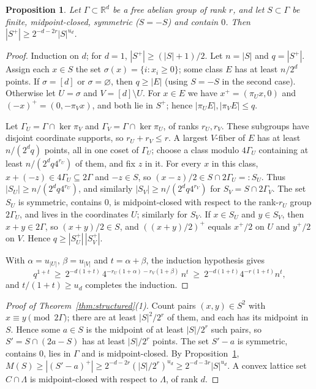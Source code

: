 \documentclass[11pt]{amsart}
\newtheorem{proposition}[theorem]{Proposition}
\theoremstyle{definition}
\theoremstyle{remark}
\newcommand{\R}{\mathbb{R}}
\newcommand{\Mf}{M}
\begin{document}
\begin{proposition}\label{prop:centered}
Let $\Gamma\subset\R^d$ be a free abelian group of rank $r$, and let $S\subset\Gamma$ be finite, midpoint-closed, symmetric ($S=-S$) and contain $0$. Then $|S^+|\ge2^{-d-2r}|S|^{u_d}$.
\end{proposition}

\begin{proof}
Induction on $d$; for $d=1$, $|S^+|\ge(|S|+1)/2$. Let $n=|S|$ and $q=|S^+|$. Assign each $x\in S$ the set $\sigma(x)=\{i:x_i\ge0\}$; some class $E$ has at least $n/2^d$ points. If $\sigma=[d]$ or $\sigma=\varnothing$, then $q\ge|E|$ (using $S=-S$ in the second case). Otherwise let $U=\sigma$ and $V=[d]\setminus U$. For $x\in E$ we have $x^+=(\pi_Ux,0)$ and $(-x)^+=(0,-\pi_Vx)$, and both lie in $S^+$; hence $|\pi_UE|,|\pi_VE|\le q$.

Let $\Gamma_U=\Gamma\cap\ker\pi_V$ and $\Gamma_V=\Gamma\cap\ker\pi_U$, of ranks $r_U,r_V$. These subgroups have disjoint coordinate supports, so $r_U+r_V\le r$. A largest $V$-fiber of $E$ has at least $n/(2^dq)$ points, all in one coset of $\Gamma_U$; choose a class modulo $4\Gamma_U$ containing at least $n/(2^dq4^{r_U})$ of them, and fix $z$ in it. For every $x$ in this class, $x+(-z)\in4\Gamma_U\subseteq2\Gamma$ and $-z\in S$, so $(x-z)/2\in S\cap2\Gamma_U=:S_U$. Thus $|S_U|\ge n/(2^dq4^{r_U})$, and similarly $|S_V|\ge n/(2^dq4^{r_V})$ for $S_V=S\cap2\Gamma_V$. The set $S_U$ is symmetric, contains $0$, is midpoint-closed with respect to the rank-$r_U$ group $2\Gamma_U$, and lives in the coordinates $U$; similarly for $S_V$. If $x\in S_U$ and $y\in S_V$, then $x+y\in2\Gamma$, so $(x+y)/2\in S$, and $((x+y)/2)^+$ equals $x^+/2$ on $U$ and $y^+/2$ on $V$. Hence $q\ge|S_U^+|\,|S_V^+|$.

With $\alpha=u_{|U|}$, $\beta=u_{|V|}$ and $t=\alpha+\beta$, the induction hypothesis gives
\[
q^{1+t}\ \ge\ 2^{-d(1+t)}\,4^{-r_U(1+\alpha)-r_V(1+\beta)}\,n^t\ \ge\ 2^{-d(1+t)}4^{-r(1+t)}n^t,
\]
and $t/(1+t)\ge u_d$ completes the induction.
\end{proof}

\begin{proof}[Proof of Theorem~\ref{thm:structured}(1)]
Count pairs $(x,y)\in S^2$ with $x\equiv y\pmod{2\Gamma}$; there are at least $|S|^2/2^r$ of them, and each has its midpoint in $S$. Hence some $a\in S$ is the midpoint of at least $|S|/2^r$ such pairs, so $S'=S\cap(2a-S)$ has at least $|S|/2^r$ points. The set $S'-a$ is symmetric, contains $0$, lies in $\Gamma$ and is midpoint-closed. By Proposition~\ref{prop:centered}, $\Mf(S)\ge|(S'-a)^+|\ge2^{-d-2r}(|S|/2^r)^{u_d}\ge2^{-d-3r}|S|^{u_d}$. A convex lattice set $C\cap\Lambda$ is midpoint-closed with respect to $\Lambda$, of rank $d$.
\end{proof}
\end{document}

